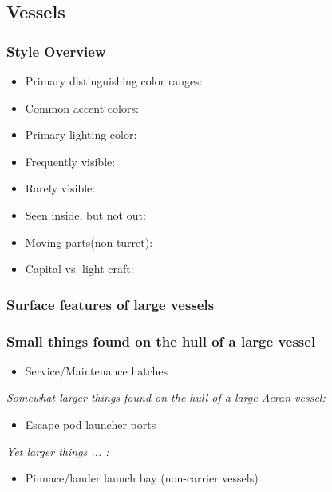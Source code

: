 

\subsection{Vessels}

\subsubsection{Style Overview}
\begin{itemize}

\item Primary distinguishing color ranges: 

\item Common accent colors:

\item Primary lighting color:

\item Frequently visible: 

\item Rarely visible:

\item Seen inside, but not out: 

\item Moving parts(non-turret): 

\item Capital vs. light craft: 

\end{itemize}

\subsubsection{Surface features of large vessels}

\subsubsection{Small things found on the hull of a large  vessel}
\begin{itemize}
\item Service/Maintenance hatches
\end{itemize}
{\it Somewhat larger things found on the hull of a large Aeran vessel:}
\begin{itemize}
\item Escape pod launcher ports
\end{itemize}
{\it Yet larger things ... :}
\begin{itemize}
\item Pinnace/lander launch bay (non-carrier vessels)
\end{itemize}

